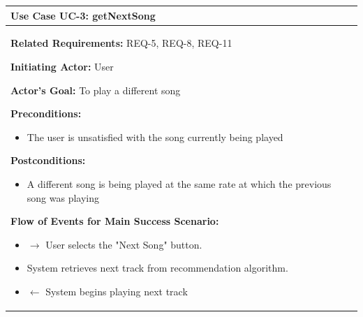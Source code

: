 \documentclass[letterpaper,english, 12pt]{scrreprt}
\begin{document}
\begin{center}
        \begin{tabular}{|C{15cm}|}
                \hline
                        \textbf{Use Case UC-3: getNextSong}\\
                \hline
                        \begin{flushleft}
                                \textbf{Related Requirements: } REQ-5, REQ-8, REQ-11
                        \end{flushleft}
                        \begin{flushleft}
                                \textbf{Initiating Actor: } User
                        \end{flushleft}
                        \begin{flushleft}
                                \textbf{Actor's Goal: } To play a different song
                        \end{flushleft}
                        \begin{flushleft}
                                \textbf{Preconditions: }
                        \end{flushleft}
                                \begin{itemize}
                                        \item The user is unsatisfied with the song currently being played
                                \end{itemize}
                        \begin{flushleft}
                                \textbf{Postconditions: }
                        \end{flushleft}
                                \begin{itemize}
                                        \item A different song is being played at the same rate at which the previous song was playing
                                \end{itemize}
                        \begin{flushleft}
                                \textbf{Flow of Events for Main Success Scenario: }
                        \end{flushleft}
                                \begin{itemize}
                                        \item $\rightarrow$ User selects the "Next Song" button.
                                        \item System retrieves next track from recommendation algorithm.
                                        \item $\leftarrow$ System begins playing next track
                                \end{itemize}
                \hline
        \end{tabular}
\end{center}
\end{document}
